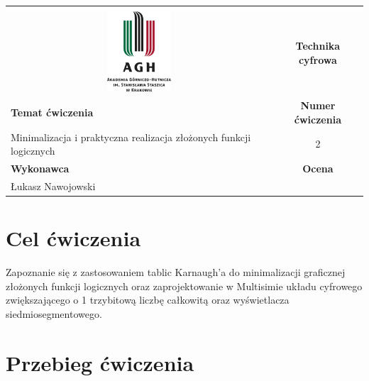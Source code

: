 \documentclass[12pt,a4paper]{article}
\begin{document}
\begin{table}[H]
\label{my-label}
\begin{tabular}[width=\textwidth]{|c|c|}
\hline
									           					&                           \\
\includegraphics[height=3cm]{logo}             					& \textbf{Technika cyfrowa} \\ \hline
\multicolumn{1}{|l|}{\textbf{Temat ćwiczenia}} 					& \textbf{Numer ćwiczenia}  \\
\multicolumn{1}{|l|}{Minimalizacja i praktyczna realizacja złożonych funkcji logicznych}	& 2                         \\ \hline
\multicolumn{1}{|l|}{\textbf{Wykonawca}}       & \textbf{Ocena}            \\
\multicolumn{1}{|l|}{Łukasz Nawojowski}          &                           \\ \hline
\end{tabular}
\end{table}

\section{Cel ćwiczenia}
Zapoznanie się z zastosowaniem tablic Karnaugh'a do minimalizacji graficznej złożonych funkcji logicznych oraz zaprojektowanie w Multisimie układu cyfrowego zwiększającego o 1 trzybitową liczbę całkowitą oraz wyświetlacza siedmiosegmentowego.

\section{Przebieg ćwiczenia}
\end{document}
